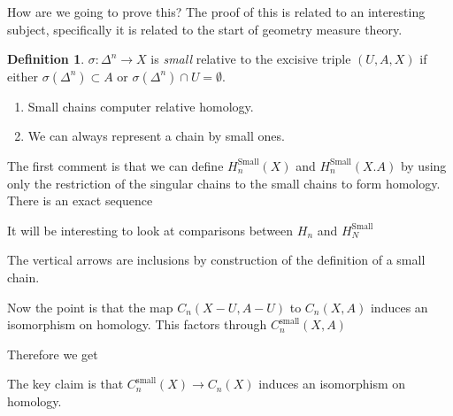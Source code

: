 \documentclass[12pt]{article}
\theoremstyle{definition}
\newtheorem{definition}[theorem]{Definition}
\begin{document}
	How are we going to prove this? The proof of this is related to an interesting subject, specifically it is related to the start of geometry measure theory.
	\begin{definition}
		$\sigma:\Delta^n\to X$ is \textit{small} relative to the excisive triple $(U,A,X)$ if either $\sigma(\Delta^n)\subset A$ or $\sigma(\Delta^n)\cap U=\emptyset$. 
	\end{definition}
	\begin{enumerate}
		\item Small chains computer relative homology.
		\item We can always represent a chain by small ones. 
	\end{enumerate}
	The first comment is that we can define $H_n^{\text{Small}}(X)$ and $H_n^{\text{Small}}(X.A)$ by using only the restriction of the singular chains to the small chains to form homology. There is an exact sequence \begin{center}
	\end{center}
	It will be interesting to look at comparisons between $H_n$ and $H_N^{\text{Small}}$
	\begin{center}
	\end{center}
	The vertical arrows are inclusions by construction of the definition of a small chain.
	
	Now the point is that the map $C_n(X-U,A-U)$ to $C_n(X,A)$ induces an isomorphism on homology. This factors through $C_n^{\text{small}}(X,A)$
	
	Therefore we get \begin{center}
	\end{center}
	The key claim is that $C_n^{\text{small}}(X)\to C_n(X)$ induces an isomorphism on homology.
	
\end{document}
